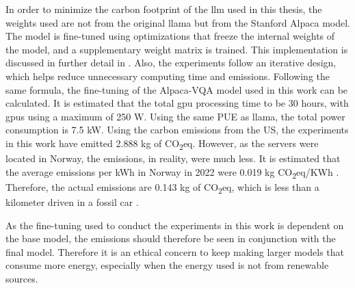 In order to minimize the carbon footprint of the \gls{llm} used in this thesis,
the weights used are not from the original \gls{llama} but from the Stanford Alpaca model. 
The model is fine-tuned using optimizations that freeze the internal weights of the model, and a supplementary weight matrix is trained. This implementation is discussed in further detail in . Also, the experiments follow an iterative design, which helps reduce unnecessary computing time and emissions.
Following the same formula, the fine-tuning of the Alpaca-VQA model used in this work can be calculated. 
It is estimated that the total \gls{gpu} processing time to be 30 hours, with \glspl{gpu} using a maximum of 250 W. Using the same PUE as \gls{llama}, the total power consumption is 7.5 kW. 
Using the carbon emissions from the US, the experiments in this work have emitted 2.888 kg of CO\textsubscript{2}eq. 
However, as the servers were located in Norway, the emissions, in reality, were much less. It is estimated that the average emissions per kWh in Norway in 2022 were 0.019 kg CO\textsubscript{2}eq/KWh \cite{LavtKlimagassutslippKnyttet}. Therefore, the actual emissions are 0.143 kg of CO\textsubscript{2}eq, which is less than a kilometer driven in a fossil car \cite{HvaPavirkerUtslipp2017}.


As the fine-tuning used to conduct the experiments in this work is dependent on the base model, the emissions should therefore be seen in conjunction with the final model. 
Therefore it is an ethical concern to keep making larger models that consume more energy, especially when the energy used is not from renewable sources.














